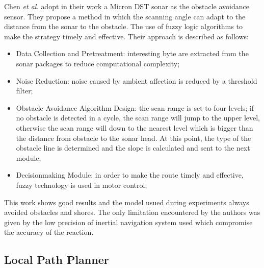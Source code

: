 \documentclass[12pt]{article}
\begin{document}
              Chen \textit{et al.} \parencite{Conference2013} adopt in their work a Micron DST sonar as the obstacle avoidance sensor. They propose a method in which the scanning angle can adapt to the distance from the sonar to the obstacle. The use of fuzzy logic algorithms to make the strategy timely and effective. Their approach is described as follows:
                    \begin{itemize}
                          \item Data Collection and Pretreatment: interesting byte are extracted from the sonar packages to reduce computational complexity;
                          \item Noise Reduction: noise caused by ambient affection is reduced by a threshold filter;
                          \item Obstacle Avoidance Algorithm Design: the scan range is set to four levels; if no obstacle is detected in a cycle, the scan range will jump to the upper level, otherwise the scan range will down to the nearest level which is bigger than the distance from obstacle to the sonar head. At this point, the type of the obstacle line is determined and the slope is calculated and sent to the next module;
                          \item Decision\-making Module: in order to make the route timely and effective, fuzzy technology is used in motor control;
                    \end{itemize}
              This work shows good results and the model usued during experiments always avoided obstacles and shores. The only limitation encountered by the authors was given by the low precision of inertial navigation system used which compromise the accuracy of the reaction.

        \subsection{Local Path Planner} \label{lpp}
\end{document}
